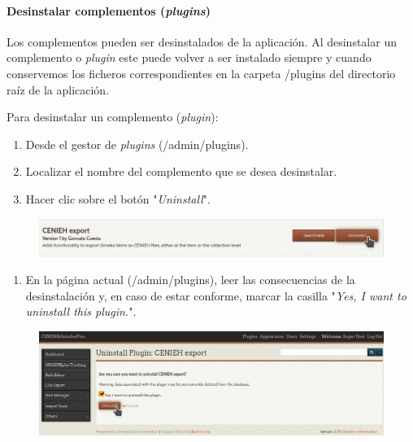 \documentclass[
]{article}
\providecommand{\tightlist}{%
  \setlength{\itemsep}{0pt}\setlength{\parskip}{0pt}}
\begin{document}
\hypertarget{desinstalar-complementos-plugins}{%
\paragraph{\texorpdfstring{Desinstalar complementos
(\emph{plugins})}{Desinstalar complementos (plugins)}}\label{desinstalar-complementos-plugins}}

Los complementos pueden ser desinstalados de la aplicación. Al
desinstalar un complemento o \emph{plugin} este puede volver a ser
instalado siempre y cuando conservemos los ficheros correspondientes en
la carpeta {/plugins} del directorio raíz de la aplicación.

Para desinstalar un complemento (\emph{plugin}):

\begin{enumerate}
\def\labelenumi{\arabic{enumi}.}
\tightlist
\item
  Desde el gestor de \emph{plugins} ({/admin/plugins}).
\item
  Localizar el nombre del complemento que se desea desinstalar.
\item
  Hacer clic sobre el botón "\emph{Uninstall}".
\end{enumerate}

\begin{figure}
\hypertarget{plugins-uninst-1}{%
\centering
\includegraphics{../_static/images/plugins-uninst-1.png}
\caption{}\label{plugins-uninst-1}
}
\end{figure}

\begin{enumerate}
\def\labelenumi{\arabic{enumi}.}
\setcounter{enumi}{3}
\tightlist
\item
  En la página actual ({/admin/plugins}), leer las consecuencias de la
  desinstalación y, en caso de estar conforme, marcar la casilla
  "\emph{Yes, I want to uninstall this plugin.}".
\end{enumerate}

\begin{figure}
\hypertarget{plugins-uninst-2}{%
\centering
\includegraphics{../_static/images/plugins-uninst-2.png}
\caption{}\label{plugins-uninst-2}
}
\end{figure}
\end{document}
